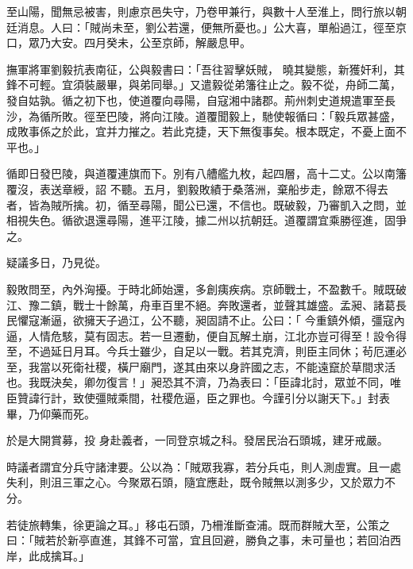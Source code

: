 \begin{pinyinscope}
 至山陽，聞無忌被害，則慮京邑失守，乃卷甲兼行，與數十人至淮上，問行旅以朝廷消息。人曰：「賊尚未至，劉公若還，便無所憂也。」公大喜，單船過江，徑至京口，眾乃大安。四月癸未，公至京師，解嚴息甲。



 撫軍將軍劉毅抗表南征，公與毅書曰：「吾往習擊妖賊，
 曉其變態，新獲奸利，其鋒不可輕。宜須裝嚴畢，與弟同舉。」又遣毅從弟籓往止之。毅不從，舟師二萬，發自姑孰。循之初下也，使道覆向尋陽，自寇湘中諸郡。荊州刺史道規遣軍至長沙，為循所敗。徑至巴陵，將向江陵。道覆聞毅上，馳使報循曰：「毅兵眾甚盛，成敗事係之於此，宜并力摧之。若此克捷，天下無復事矣。根本既定，不憂上面不平也。」



 循即日發巴陵，與道覆連旗而下。別有八艚艦九枚，起四層，高十二丈。公以南籓覆沒，表送章綬，詔
 不聽。五月，劉毅敗績于桑落洲，棄船步走，餘眾不得去者，皆為賊所擒。初，循至尋陽，聞公已還，不信也。既破毅，乃審凱入之問，並相視失色。循欲退還尋陽，進平江陵，據二州以抗朝廷。道覆謂宜乘勝徑進，固爭之。



 疑議多日，乃見從。



 毅敗問至，內外洶擾。于時北師始還，多創痍疾病。京師戰士，不盈數千。賊既破江、豫二鎮，戰士十餘萬，舟車百里不絕。奔敗還者，並聲其雄盛。孟昶、諸葛長民懼寇漸逼，欲擁天子過江，公不聽，昶固請不止。公曰：「
 今重鎮外傾，彊寇內逼，人情危駭，莫有固志。若一旦遷動，便自瓦解土崩，江北亦豈可得至！設令得至，不過延日月耳。今兵士雖少，自足以一戰。若其克濟，則臣主同休；茍厄運必至，我當以死衛社稷，橫尸廟門，遂其由來以身許國之志，不能遠竄於草間求活也。我既決矣，卿勿復言！」昶恐其不濟，乃為表曰：「臣諱北討，眾並不同，唯臣贊諱行計，致使彊賊乘間，社稷危逼，臣之罪也。今謹引分以謝天下。」封表畢，乃仰藥而死。



 於是大開賞募，投
 身赴義者，一同登京城之科。發居民治石頭城，建牙戒嚴。



 時議者謂宜分兵守諸津要。公以為：「賊眾我寡，若分兵屯，則人測虛實。且一處失利，則沮三軍之心。今聚眾石頭，隨宜應赴，既令賊無以測多少，又於眾力不分。



 若徒旅轉集，徐更論之耳。」移屯石頭，乃柵淮斷查浦。既而群賊大至，公策之曰：「賊若於新亭直進，其鋒不可當，宜且回避，勝負之事，未可量也；若回泊西岸，此成擒耳。」




\end{pinyinscope}
